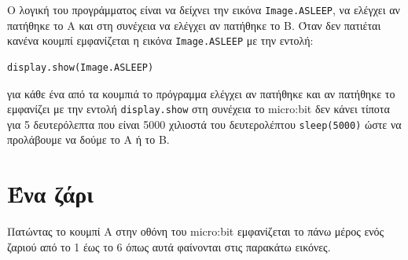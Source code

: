 \documentclass[11pt]{article}
\begin{document}
Ο λογική του προγράμματος είναι να δείχνει την εικόνα \lstinline{Image.ASLEEP}, να ελέγχει αν πατήθηκε το Α και στη συνέχεια να ελέγχει αν πατήθηκε το Β. Όταν δεν πατιέται κανένα κουμπί εμφανίζεται η εικόνα \lstinline{Image.ASLEEP}  με την εντολή:
\begin{lstlisting}[firstnumber=8]
display.show(Image.ASLEEP)
\end{lstlisting}
για κάθε ένα από τα κουμπιά το πρόγραμμα ελέγχει αν πατήθηκε και αν πατήθηκε το εμφανίζει με την εντολή \lstinline{display.show}  στη συνέχεια το micro:bit δεν κάνει τίποτα για 5 δευτερόλεπτα που είναι 5000 χιλιοστά του δευτερολέπτου \lstinline{sleep(5000)} ώστε να προλάβουμε να δούμε το Α ή το Β.
\section{Ένα ζάρι}
Πατώντας το κουμπί Α στην οθόνη του micro:bit εμφανίζεται το πάνω μέρος ενός ζαριού από το 1 έως το 6 όπως αυτά φαίνονται στις παρακάτω εικόνες.
\end{document}
